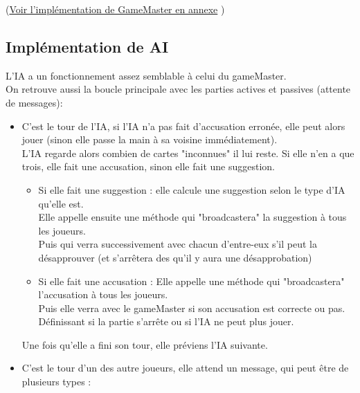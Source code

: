\documentclass[a4paper,10pt]{article}
\begin{document}
		(\hyperlink{GameMasterImplementation}{Voir l'implémentation de GameMaster en annexe} )		
		
		

	
	\subsection{Implémentation de AI}
	L'IA a un fonctionnement assez semblable à celui du gameMaster.\\
	On retrouve aussi la boucle principale avec les parties actives et passives (attente de messages):
		\begin{itemize}
			\item C'est le tour de l'IA, si l'IA n'a pas fait d'accusation erronée, elle peut alors jouer (sinon elle passe la main à sa voisine immédiatement).\\
				L'IA regarde alors combien de cartes "inconnues" il lui reste. Si elle n'en a que trois, elle fait une accusation, sinon elle fait une suggestion.
				\begin{itemize}
					\item Si elle fait une suggestion : elle calcule une suggestion selon le type d'IA qu'elle est.\\
						Elle appelle ensuite une méthode qui "broadcastera" la suggestion à tous les joueurs.\\
						 Puis qui verra successivement avec chacun d'entre-eux s'il peut la désapprouver (et s'arrêtera des qu'il y aura une désapprobation)
					\item Si elle fait une accusation : Elle appelle une méthode qui "broadcastera" l'accusation à tous les joueurs.\\
						 Puis elle verra avec le gameMaster si son accusation est correcte ou pas. Définissant si la partie s'arrête ou si l'IA ne peut plus jouer.
				\end{itemize}
				Une fois qu'elle a fini son tour, elle préviens l'IA suivante.
			\item C'est le tour d'un des autre joueurs, elle attend un message, qui peut être de plusieurs types :

\end{itemize}
\end{document}
